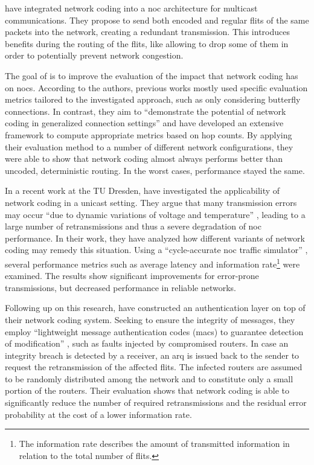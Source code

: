 \citeauthor{xue15ncnoc} \cite{xue15ncnoc} have integrated network coding into a \gls{noc} architecture for multicast communications. They propose to
send both encoded and regular flits of the same packets into the network, creating a redundant transmission. This introduces benefits during the
routing of the flits, like allowing to drop some of them in order to potentially prevent network congestion.

The goal of \citeauthor{vonbun13nchopcount} \cite{vonbun13nchopcount} is to improve the evaluation of the impact that network coding has on
\glspl{noc}. According to the authors, previous works mostly used specific evaluation metrics tailored to the investigated approach, such as only
considering butterfly connections. In contrast, they aim to \enquote{demonstrate the potential of network coding in generalized connection settings}
\cite[2]{vonbun13nchopcount} and have developed an extensive framework to compute appropriate metrics based on hop counts. By applying their
evaluation method to a number of different network configurations, they were able to show that network coding almost always performs better than uncoded,
deterministic routing. In the worst cases, performance stayed the same.

In a recent work at the TU Dresden, \citeauthor{moriam15manycorenc} \cite{moriam15manycorenc} have investigated the applicability of network coding in
a unicast setting. They argue that many transmission errors may occur \enquote{due to dynamic variations of voltage and temperature}
\cite[1]{moriam15manycorenc}, leading to a large number of retransmissions and thus a severe degradation of \gls{noc} performance. In their work, they
have analyzed how different variants of network coding may remedy this situation. Using a \enquote{cycle-accurate \gls{noc} traffic simulator}
\cite[3]{moriam15manycorenc}, several performance metrics such as average latency and information rate\footnote{The information rate describes the
amount of transmitted information in relation to the total number of flits.} were examined. The results show significant improvements for error-prone
transmissions, but decreased performance in reliable networks.

Following up on this research, \citeauthor{moriam18activeattackers} \cite{moriam18activeattackers} have constructed an authentication layer on top of
their network coding system. Seeking to ensure the integrity of messages, they employ \enquote{lightweight message authentication codes (\glspl{mac})
to guarantee detection of modification} \cite[1]{moriam18activeattackers}, such as faults injected by compromised routers. In case an integrity breach is
detected by a receiver, an \gls{arq} is issued back to the sender to request the retransmission of the affected flits. The infected routers are assumed to
be randomly distributed among the network and to constitute only a small portion of the routers. Their evaluation shows that network coding is able to
significantly reduce the number of required retransmissions and the residual error probability at the cost of a lower information rate.

